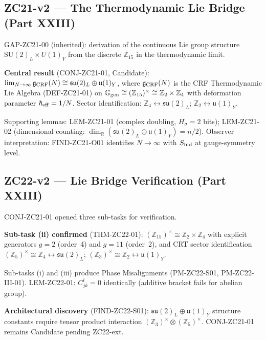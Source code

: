 \documentclass[11pt, a4paper]{article}
\newcommand{\Ztf}{\mathbb{Z}_{15}}
\newcommand{\Ggen}{\mathbb{G}_{\rm gen}}
\newcommand{\heff}{\hbar_{\rm eff}}
\newcommand{\gCRF}{\mathfrak{g}_{\rm CRF}}
\newcommand{\suLie}{\mathfrak{su}(2)_L}
\newcommand{\uLie}{\mathfrak{u}(1)_Y}
\newcommand{\SU}{\mathrm{SU}(2)_L}
\newcommand{\UY}{U(1)_Y}
\newcommand{\Sind}{S_{\rm ind}}
\begin{document}
\subsection{ZC21-v2 --- The Thermodynamic Lie Bridge (Part XXIII)}

\begin{zcbox}[title={ZC21: CONJ-ZC21-01 --- Candidate}]
\sloppy
GAP-ZC21-00 (inherited): derivation of the continuous Lie group structure
$\SU \times \UY$ from the discrete $\Ztf$ in the thermodynamic limit.

\textbf{Central result} (CONJ-ZC21-01, Candidate):
$\lim_{N\to\infty} \gCRF(N) \cong \suLie \oplus \uLie$,
where $\gCRF(N)$ is the CRF Thermodynamic Lie Algebra (DEF-ZC21-01)
on $\Ggen \cong (\Ztf)^\times \cong \mathbb{Z}_2 \times \mathbb{Z}_4$
with deformation parameter $\heff = 1/N$.
Sector identification: $\mathbb{Z}_4 \leftrightarrow \suLie$;
$\mathbb{Z}_2 \leftrightarrow \uLie$.

Supporting lemmas: LEM-ZC21-01 (complex doubling, $H_\sigma = 2$ bits);
LEM-ZC21-02 (dimensional counting: $\dim_\mathbb{R}(\suLie\oplus\uLie) = n/2$).
Observer interpretation: FIND-ZC21-O01 identifies $N\to\infty$ with $\Sind$
at gauge-symmetry level.
\end{zcbox}

\subsection{ZC22-v2 --- Lie Bridge Verification (Part XXIII)}

\begin{zcbox}[title={ZC22: THM-ZC22-01 and Tensor Product Discovery}]
\sloppy
CONJ-ZC21-01 opened three sub-tasks for verification.

\textbf{Sub-task (ii) confirmed} (THM-ZC22-01):
$(\Ztf)^\times \cong \mathbb{Z}_2 \times \mathbb{Z}_4$
with explicit generators $g=2$ (order~4) and $g=11$ (order~2),
and CRT sector identification
$(\mathbb{Z}_5)^\times \cong \mathbb{Z}_4 \leftrightarrow \suLie$;
$(\mathbb{Z}_3)^\times \cong \mathbb{Z}_2 \leftrightarrow \uLie$.

Sub-tasks (i) and (iii) produce Phase Misalignments (PM-ZC22-S01, PM-ZC22-III-01).
LEM-ZC22-01: $C^l_{jk} = 0$ identically (additive bracket fails for abelian group).

\textbf{Architectural discovery} (FIND-ZC22-S01): $\suLie\oplus\uLie$ structure
constants require tensor product interaction
$(\mathbb{Z}_3)^\times \otimes (\mathbb{Z}_5)^\times$.
CONJ-ZC21-01 remains Candidate pending ZC22-ext.
\end{zcbox}
\end{document}

